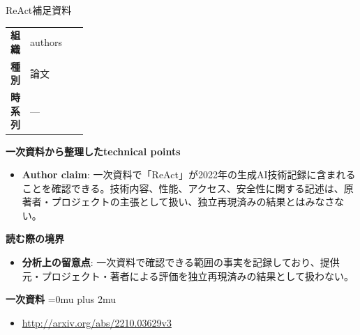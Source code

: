 \begin{technicalnote}{ReAct}{補足資料}
\begingroup
\begin{tabularx}{\linewidth}{@{}>{\bfseries}p{0.22\linewidth}X@{}}
組織 & authors \\
種別 & 論文 \\
時系列 & — \\
\end{tabularx}
\smallskip
{\bfseries 一次資料から整理したtechnical points}
\begin{itemize}[leftmargin=1.5em,itemsep=0.35em]
\item \textbf{Author claim}: 一次資料で「ReAct」が2022年の生成AI技術記録に含まれることを確認できる。技術内容、性能、アクセス、安全性に関する記述は、原著者・プロジェクトの主張として扱い、独立再現済みの結果とはみなさない。
\end{itemize}
\begin{minipage}{\linewidth}
{\bfseries 読む際の境界}
\begin{itemize}[leftmargin=1.5em,itemsep=0.35em]
\item \textbf{分析上の留意点}: 一次資料で確認できる範囲の事実を記録しており、提供元・プロジェクト・著者による評価を独立再現済みの結果として扱わない。
\end{itemize}
\begin{samepage}
{\bfseries 一次資料}
\begingroup\sloppy
\Urlmuskip=0mu plus 2mu\relax
\begin{itemize}[leftmargin=1.5em,itemsep=0.25em]
\item {\scriptsize\url{http://arxiv.org/abs/2210.03629v3}}
\end{itemize}
\endgroup
\end{samepage}
\end{minipage}
\endgroup
\end{technicalnote}
\medskip

